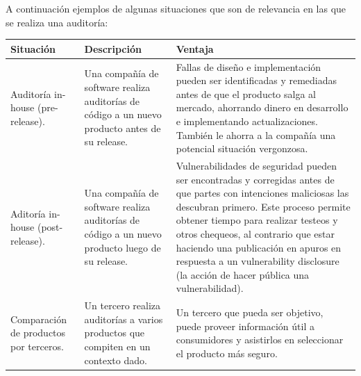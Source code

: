 A continuación ejemplos de algunas situaciones que son de relevancia en las que se realiza una auditoría:\newline

\begin{tabular}{|p{4.3cm}|p{4.3cm}|p{4.3cm}|}
    \hline
    \textbf{Situación} & \textbf{Descripción} & \textbf{Ventaja} \\
    \hline
    Auditoría in-house (pre-release). & Una compañía de software realiza auditorías de código a un nuevo producto antes de su release. & Fallas de diseño e implementación pueden ser identificadas y remediadas antes de que el producto salga al mercado, ahorrando dinero en desarrollo e implementando actualizaciones. También le ahorra a la compañía una potencial situación vergonzosa. \\
    \hline
    Aditoría in-house (post-release). & Una compañía de software realiza auditorías de código a un nuevo producto luego de su release. & 
    Vulnerabilidades de seguridad pueden ser encontradas y corregidas antes de que partes con intenciones maliciosas las descubran primero. Este proceso permite obtener tiempo para realizar testeos y otros chequeos, al contrario que estar haciendo una publicación en apuros en respuesta a un vulnerability disclosure (la acción de hacer pública una vulnerabilidad). \\
    \hline
    Comparación de productos por terceros. & Un tercero realiza auditorías a varios productos que compiten en un contexto dado. & Un tercero que pueda ser objetivo, puede proveer información útil a consumidores y asistirlos en seleccionar el producto más seguro. \\
    \hline
\end{tabular}
\pagebreak


